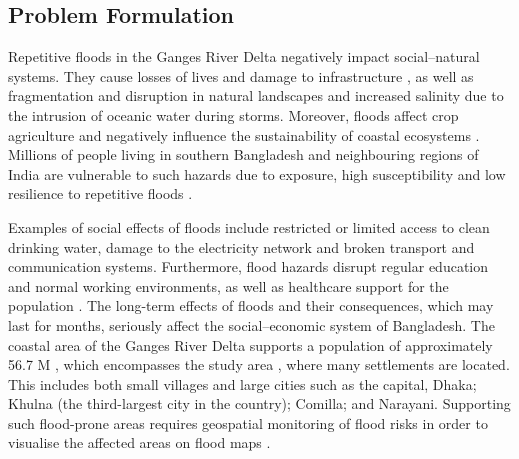 \documentclass[water,article,accept,pdftex,oneauhor]{Definitions/mdpi}
\begin{document}
\subsection{Problem Formulation}
Repetitive floods in the Ganges River Delta negatively impact social--natural systems{. They cause }losses of lives and damage to infrastructure \cite{JERIN2023}, as well as fragmentation and disruption in natural landscapes \cite{MUKHERJEE2021106961} and {increased salinity due to the intrusion of oceanic water }during storms. {Moreover, }floods affect crop agriculture \cite{ABEDIN2023315,ALMASUD2020104443} and negatively influence the sustainability of coastal ecosystems \cite{SARKER2024169718,MAINUDDIN2021105740,HASAN2023101028}. Millions of people living in southern Bangladesh and neighbouring regions of India are vulnerable to {such hazards }due to exposure, high susceptibility and low resilience {to repetitive floods} \cite{SINGHA2020106825,RUMPA2023104047}. 

Examples of social effects of floods include {restricted or limited access} to clean drinking water{, damage to the }electricity {network} and broken transport and communication systems{. Furthermore, flood hazards disrupt} regular education and normal working environments, {as well as} healthcare support for the population \cite{JERIN2023103851,NAHIN2023e14520}. The long-term effects of {floods and their} consequences, which may last for months, seriously affect the social--economic system of Bangladesh. The coastal area of the Ganges River Delta supports a population of approximately 56.7 M %
 , which encompasses the study area \cite{DAS2021101983}, where many settlements are located{. This includes }both small villages and large cities such as the capital, Dhaka; Khulna (the third-largest city in the country); Comilla; and Narayani. Supporting such flood-prone areas requires geospatial monitoring of flood risks in order to visualise the affected areas on flood maps \cite{Alietal,AZAD2023100498}.
\end{document}
